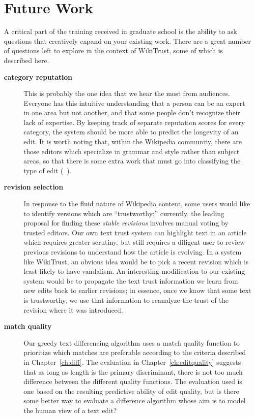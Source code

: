 \section{Future Work}

A critical part of the training received in graduate school
is the ability to ask questions that creatively expand on your
existing work.
There are a great number of questions left to explore in the
context of WikiTrust, some of which is described here.

\begin{description}
\item[\textbf{category reputation}]
    This is probably the one idea that we hear the most from audiences.
    Everyone has this intuitive understanding that a person can be
    an expert in one area but not another, and that some people don't
    recognize their lack of expertise.
    By keeping track of separate reputation scores for every category,
    the system should be more able to predict the longevity of an edit.
    It is worth noting that, within the Wikipedia community, there
    are those editors which specialize in grammar and style rather than
    subject areas, so that there is some extra work that must go
    into classifying the type of edit (\eg~\cite{Fong2010}).

\item[\textbf{revision selection}]
   In response to the fluid nature of Wikipedia content,
    some users would like to identify versions which
    are ``trustworthy;'' currently, the leading proposal
    for finding these \textit{stable revisions}
    involves manual voting by trusted editors.
    Our own text trust system can highlight text in
    an article which requires greater scrutiny, but
    still requires a diligent user to review previous
    revisions to understand how the article is evolving.
    In a system like WikiTrust, an obvious idea would be to pick
    a recent revision which is least likely to have vandalism.
    An interesting modification to our existing system would be
    to propagate the text trust information we learn from new edits
    back to earlier revisions; in essence, once we know that some
    text is trustworthy, we use that information to reanalyze the
    trust of the revision where it was introduced.

\item[\textbf{match quality}] Our greedy text differencing algorithm
    uses a match quality function to prioritize which matches are
    preferable according to the criteria described in Chapter~\ref{ch:diff}.
    The evaluation in Chapter~\ref{ch:editquality}
    suggests that as long as length
    is the primary discriminant, there is not too much difference
    between the different quality functions.
    The evaluation used is one based on the resulting predictive ability
    of edit quality, but is there some better way to evaluate a difference
    algorithm whose aim is to model the human view of a text edit?


\end{description}
